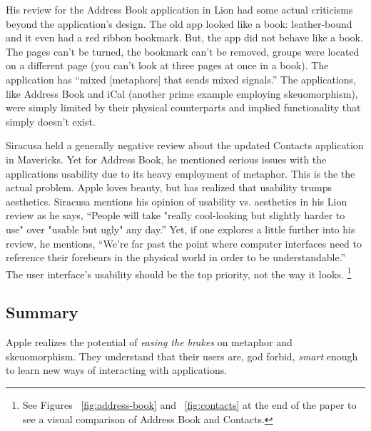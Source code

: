 \documentclass[11pt, oneside]{article}
\begin{document}
His review for the Address Book application in Lion had some actual criticisms beyond the application's design. The old app looked like a book: leather-bound and it even had a red ribbon bookmark. But, the app did not behave like a book. The pages can't be turned, the bookmark can't be removed, groups were located on a different page (you can't look at three pages at once in a book). The application has ``mixed [metaphors] that sends mixed signals.''  The applications, like Address Book and iCal (another prime example employing skeuomorphism), were simply limited by their physical counterparts and implied functionality that simply doesn't exist. \cite{ars-technica-lion}

Siracusa held a generally negative review about the updated Contacts application in Mavericks. Yet for Address Book, he mentioned serious issues with the applications usability due to its heavy employment of metaphor. This is the the actual problem. Apple loves beauty, but has realized that usability trumps aesthetics. Siracusa mentions his opinion of usability vs. aesthetics in his Lion review as he says, ``People will take "really cool-looking but slightly harder to use" over "usable but ugly" any day.'' Yet, if one explores a little further into his review, he mentions, ``We're far past the point where computer interfaces need to reference their forebears in the physical world in order to be understandable.'' The user interface's usability should be the top priority, not the way it looks. \footnote{See Figures ~\ref{fig:address-book} and ~\ref{fig:contacts} at the end of the paper to see a visual comparison of Address Book and Contacts.}
 
\subsection{Summary}
Apple realizes the potential of \textit{easing the brakes} on metaphor and skeuomorphism. They understand that their users are, god forbid, \textit{smart} enough to learn new ways of interacting with applications.
\end{document}
